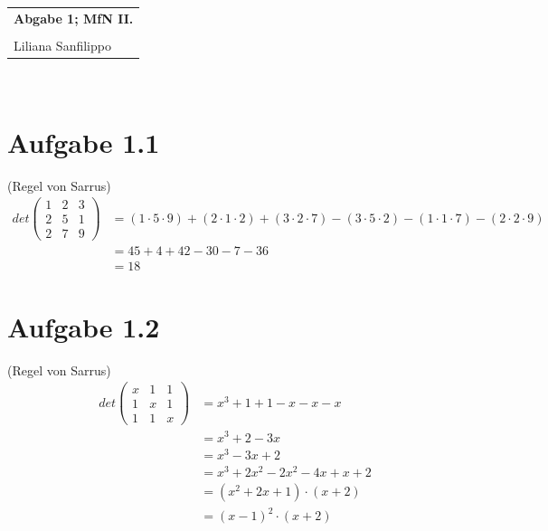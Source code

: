 \documentclass{article} %
\newcommand{\titulo}{Abgabe 1; MfN II.}
\newcommand{\nombre}{Liliana Sanfilippo}
\begin{document}
\begin{tabular}{p{12cm}} 
{{\Large\bf\titulo}}\\
\vspace{0.2cm}\\
 {\large\nombre}\\
\end{tabular}
\vspace{0.2cm}\\
\section{Aufgabe 1.1}
(Regel von Sarrus)
\begin{align*}
det 
\begin{pmatrix}
1 & 2 & 3 \\
2 & 5 & 1 \\
2 & 7 & 9
\end{pmatrix} & = 
(1 \cdot 5 \cdot 9) + (2 \cdot 1 \cdot 2) + (3 \cdot 2 \cdot 7) - (3\cdot5\cdot2) - (1 \cdot 1 \cdot 7) - (2 \cdot 2 \cdot 9) \\
&  = 45 + 4 + 42 - 30 - 7 - 36 \\
& = 18
\end{align*} 

\section{Aufgabe 1.2}
(Regel von Sarrus)
\begin{align*}
det 
\begin{pmatrix}
x & 1 & 1 \\
1 & x & 1 \\
1 & 1 & x
\end{pmatrix} & = x^3 + 1 + 1 - x - x - x \\
& = x^3 +2 -3x  \\
& = x^3 - 3x +2 \\
& = x^3 +2x^2 -2x^2 - 4x +x +2 \\
& = (x^2 + 2x +1) \cdot (x+2) \\
& = (x-1)^2 \cdot (x+2)
\end{align*} 
\end{document}
